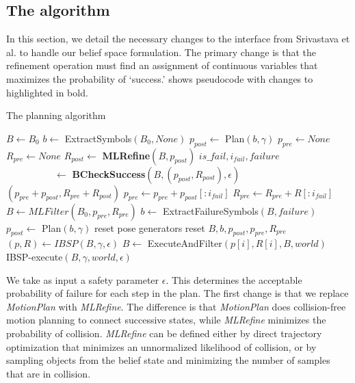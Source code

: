 \subsection{The \ibsp{} algorithm}
\label{sec-ibsp}
In this section, we detail the necessary changes to the interface from
Srivastava et al. to handle our belief space formulation. The primary
change is that the refinement operation must find an assignment of
continuous variables that maximizes the probability of
`success.'  shows pseudocode with changes to  highlighted in bold.

\begin{algorithm}
 \caption{The \ibsp{} planning algorithm} \label{alg-ibsp}
 \begin{algorithmic}[1]
  \State $B \leftarrow B_0$
  \State $b \leftarrow $ ExtractSymbols$(B_0, None)$
  \State $p_{post} \leftarrow $ Plan$(b, \gamma)$
  \State $p_{pre} \leftarrow None$
  \State $R_{pre} \leftarrow None$
     \State $R_{post} \leftarrow $ \textbf{MLRefine}$(B, p_{post})$
     \State $is\_fail,i_{fail}, failure$\\\ \ \ \ \ \ \ \ \ \ $\leftarrow $ \textbf{BCheckSuccess}$(B, (p_{post}, R_{post}), \epsilon)$
         \State \Return $(p_{pre} + p_{post}, R_{pre} + R_{post})$
     \EndIf
     \State $p_{pre} \leftarrow p_{pre} + p_{post}[:i_{fail}]$
     \State $R_{pre} \leftarrow R_{pre} + R[:i_{fail}]$
     \State $B \leftarrow MLFilter(B_0, p_{pre}, R_{pre})$
     \State $b\leftarrow $ ExtractFailureSymbols$(B, failure)$
     \State $p_{post} \leftarrow $ Plan$(b, \gamma)$     
        \State reset pose generators
        \State reset $B, b, p_{post}, p_{pre}, R_{pre}$
     \EndIf
  \EndWhile
  \EndProcedure
    \State $(p, R) \leftarrow IBSP(B, \gamma, \epsilon)$
      \State $B \leftarrow$ ExecuteAndFilter$(p[i], R[i], B, world)$
        \State \Return IBSP-execute$(B, \gamma, world, \epsilon)$
      \EndIf
    \EndFor
  \EndProcedure
 \end{algorithmic}
\end{algorithm}


We take as input a safety parameter $\epsilon$. This determines the
acceptable probability of failure for each step in the plan. The first
change is that we replace \emph{MotionPlan} with \emph{MLRefine}. The
difference is that \emph{MotionPlan} does collision-free motion
planning to connect successive states, while \emph{MLRefine} minimizes
the probability of collision. \emph{MLRefine} can be defined either by
direct trajectory optimization that minimizes an unnormalized likelihood of collision,
or by sampling objects from the belief state and minimizing the number
of samples that are in collision.

